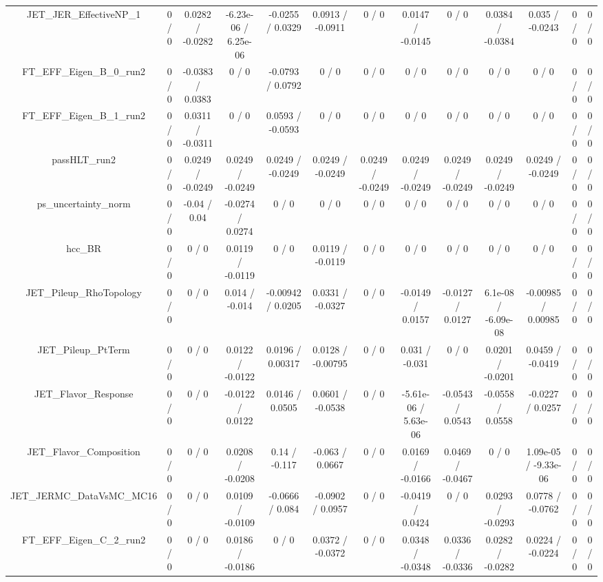 \documentclass[10pt]{article}
\begin{document}
\begin{table}[htbp]
\begin{center}
\begin{tabular}{|c|c|c|c|c|c|c|c|c|c|c|c|c|}
  JET_JER_EffectiveNP_1 & 0 / 0 & 0.0282 / -0.0282 & -6.23e-06 / 6.25e-06 & -0.0255 / 0.0329 & 0.0913 / -0.0911 & 0 / 0 & 0.0147 / -0.0145 & 0 / 0 & 0.0384 / -0.0384 & 0.035 / -0.0243 & 0 / 0 & 0 / 0 \\ 
  FT_EFF_Eigen_B_0_run2 & 0 / 0 & -0.0383 / 0.0383 & 0 / 0 & -0.0793 / 0.0792 & 0 / 0 & 0 / 0 & 0 / 0 & 0 / 0 & 0 / 0 & 0 / 0 & 0 / 0 & 0 / 0 \\ 
  FT_EFF_Eigen_B_1_run2 & 0 / 0 & 0.0311 / -0.0311 & 0 / 0 & 0.0593 / -0.0593 & 0 / 0 & 0 / 0 & 0 / 0 & 0 / 0 & 0 / 0 & 0 / 0 & 0 / 0 & 0 / 0 \\ 
  passHLT_run2 & 0 / 0 & 0.0249 / -0.0249 & 0.0249 / -0.0249 & 0.0249 / -0.0249 & 0.0249 / -0.0249 & 0.0249 / -0.0249 & 0.0249 / -0.0249 & 0.0249 / -0.0249 & 0.0249 / -0.0249 & 0.0249 / -0.0249 & 0 / 0 & 0 / 0 \\ 
  ps_uncertainty_norm & 0 / 0 & -0.04 / 0.04 & -0.0274 / 0.0274 & 0 / 0 & 0 / 0 & 0 / 0 & 0 / 0 & 0 / 0 & 0 / 0 & 0 / 0 & 0 / 0 & 0 / 0 \\ 
  hcc_BR & 0 / 0 & 0 / 0 & 0.0119 / -0.0119 & 0 / 0 & 0.0119 / -0.0119 & 0 / 0 & 0 / 0 & 0 / 0 & 0 / 0 & 0 / 0 & 0 / 0 & 0 / 0 \\ 
  JET_Pileup_RhoTopology & 0 / 0 & 0 / 0 & 0.014 / -0.014 & -0.00942 / 0.0205 & 0.0331 / -0.0327 & 0 / 0 & -0.0149 / 0.0157 & -0.0127 / 0.0127 & 6.1e-08 / -6.09e-08 & -0.00985 / 0.00985 & 0 / 0 & 0 / 0 \\ 
  JET_Pileup_PtTerm & 0 / 0 & 0 / 0 & 0.0122 / -0.0122 & 0.0196 / 0.00317 & 0.0128 / -0.00795 & 0 / 0 & 0.031 / -0.031 & 0 / 0 & 0.0201 / -0.0201 & 0.0459 / -0.0419 & 0 / 0 & 0 / 0 \\ 
  JET_Flavor_Response & 0 / 0 & 0 / 0 & -0.0122 / 0.0122 & 0.0146 / 0.0505 & 0.0601 / -0.0538 & 0 / 0 & -5.61e-06 / 5.63e-06 & -0.0543 / 0.0543 & -0.0558 / 0.0558 & -0.0227 / 0.0257 & 0 / 0 & 0 / 0 \\ 
  JET_Flavor_Composition & 0 / 0 & 0 / 0 & 0.0208 / -0.0208 & 0.14 / -0.117 & -0.063 / 0.0667 & 0 / 0 & 0.0169 / -0.0166 & 0.0469 / -0.0467 & 0 / 0 & 1.09e-05 / -9.33e-06 & 0 / 0 & 0 / 0 \\ 
  JET_JERMC_DataVsMC_MC16 & 0 / 0 & 0 / 0 & 0.0109 / -0.0109 & -0.0666 / 0.084 & -0.0902 / 0.0957 & 0 / 0 & -0.0419 / 0.0424 & 0 / 0 & 0.0293 / -0.0293 & 0.0778 / -0.0762 & 0 / 0 & 0 / 0 \\ 
  FT_EFF_Eigen_C_2_run2 & 0 / 0 & 0 / 0 & 0.0186 / -0.0186 & 0 / 0 & 0.0372 / -0.0372 & 0 / 0 & 0.0348 / -0.0348 & 0.0336 / -0.0336 & 0.0282 / -0.0282 & 0.0224 / -0.0224 & 0 / 0 & 0 / 0 \\ 

\end{tabular}
\end{center}
\end{table}
\end{document}
